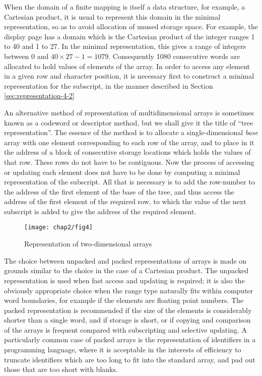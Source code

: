 When the domain of a finite mapping is itself a data structure, for example, a Cartesian product, it is usual to represent this domain in the minimal representation, so as to avoid allocation of unused storage space. For example, the display page has a domain which is the Cartesian product of the integer ranges 1 to 40 and 1 to 27. In the minimal representation, this gives a range of integers between 0 and $40 \times 27 - 1 = 1079$. Consequently 1080 consecutive words are allocated to hold values of elements of the array. In order to access any element in a given row and character position, it is necessary first to construct a minimal representation for the subscript, in the manner described in Section \ref{sec:representation-4-2}

An alternative method of representation of multidimensional arrays is sometimes known as a codeword or descriptor method, but we shall give it the title of ``tree representation''. The essence of the method is to allocate a single-dimensional \textit{base} array with one element corresponding to each row of the array, and to place in it the address of a block of consecutive storage locations which holds the values of that row. These rows do not have to be contiguous. Now the process of accessing or updating each element does not have to be done by computing a minimal representation of the subscript. All that is necessary is to add the row-number to the address of the first element of the base of the tree, and thus access the address of the first element of the required row, to which the value of the next subscript is added to give the address of the required element.

\begin{figure}[h]
	\centering
	\texttt{[image: chap2/fig4]}
	\caption{Representation of two-dimensional arrays}
\end{figure}

The choice between unpacked and packed representations of arrays is made on grounds similar to the choice in the case of a Cartesian product. The unpacked representation is used when fast access and updating is required; it is also the obviously appropriate choice when the range type naturally fits within computer word boundaries, for example if the elements are floating point numbers. The packed representation is recommended if the size of the elements is considerably shorter than a single word, and if storage is short, or if copying and comparison of the arrays is frequent compared with subscripting and selective updating. A particularly common case of packed arrays is the representation of identifiers in a programming language, where it is acceptable in the interests of efficiency to truncate identifiers which are too long to fit into the standard array, and pad out those that are too short with blanks.

